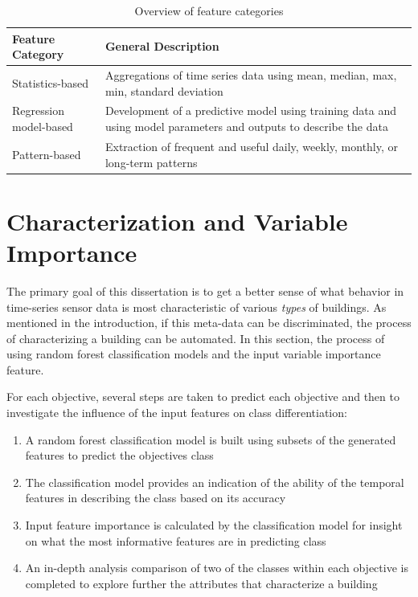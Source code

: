\begin{table} 
    \begin{tabular}{| p{8cm} | p{6cm}  |}
        \textbf{Feature Category} &  \textbf{General Description}\\ 
        \hline
        Statistics-based & Aggregations of time series data using mean, median, max, min, standard deviation \\ 
        \hline
        Regression model-based & Development of a predictive model using training data and using model parameters and outputs to describe the data \\ 
        \hline
        Pattern-based &  Extraction of frequent and useful daily, weekly, monthly, or long-term patterns\\ 
        \hline
    \end{tabular} 
    \caption{Overview of feature categories}
\end{table}
\label{tab:featureoverview}

\section{Characterization and Variable Importance}
\label{sec:variableimportance}

The primary goal of this dissertation is to get a better sense of what behavior in time-series sensor data is most characteristic of various \emph{types} of buildings. As mentioned in the introduction, if this meta-data can be discriminated, the process of characterizing a building can be automated. In this section, the process of using random forest classification models and the input variable importance feature.

For each objective, several steps are taken to predict each objective and then to investigate the influence of the input features on class differentiation:
\begin{enumerate}
\item A random forest classification model is built using subsets of the generated features to predict the objectives class
\item The classification model provides an indication of the ability of the temporal features in describing the class based on its accuracy
\item Input feature importance is calculated by the classification model for insight on what the most informative features are in predicting class
\item An in-depth analysis comparison of two of the classes within each objective is completed to explore further the attributes that characterize a building
\end{enumerate}

